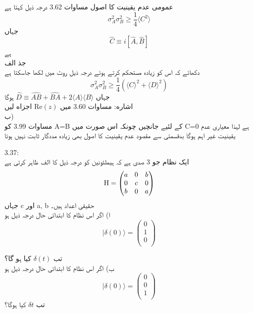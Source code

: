 عمومی عدم یقینيت کا اصول مساوات  3.62 درجہ ذيل کہتا ہے
\[\sigma_{A}^{2}\sigma_{B}^{2}\geq\frac{1}{4}\langle C^{2} \rangle\]
جہاں
\[\hat{C}\equiv i[\hat{A},\hat{B}]\]
ہے\\ 
جذ الف\\
دکھائے کہ اس کو زیادہ مستحكم کرتے ہوئے درجہ ذیل روٹ میں لکھا جاسکتا ہے
\[\sigma_{A}^{2}\sigma_{B}^{2}\geq\frac{1}{4}(\langle C\rangle^{2}+\langle D \rangle ^{2})\]
جہاں
\(\hat{D}\equiv \hat{AB}+\hat{BA}+2\langle A \rangle \langle B \rangle\)
ہوگا\\
اشاره: مساوات 3.60 میں 
\(\text{Re}(z)\)
 اجزاه لیں\\
ب)\\
مساوات 3.99 کو
 A=B
  کے لئیے جانچیں چونکہ اس صورت میں
 C=0
   ہے لہذا معیاری عدم یقینیت غیر اہم ہوگا بدقسمتی سے مقصود عدم یقینيت کا اصول بھی زیادہ مددگار ثابت نہیں ہوتا\\

 3.37:\\
ایک نظام جو 3 صدی ہے کہ ہیملٹونین کو درجہ ذيل کا الف ظاہر کرتی ہے
\[\text{\text{H}}=\begin{pmatrix}
a&0&b\\
0&c&0\\
b&0&a\\
\end{pmatrix}\]
جہاں c اور a, b حقیقی اعداد ہیں۔\\
ا) اگر اس نظام کا ابتدائی حال درجہ ذيل ہو
\[|\delta(0) \rangle=\begin{pmatrix}
0\\
1\\
0\\
\end{pmatrix}\]

تب
\(\delta(t)\)
  کیا ہو گا؟\\
ب) اگر اس نظام کا ابتدائی حال درجہ ذيل ہو
\[| \delta(0)\rangle =\begin{pmatrix}
0\\
0\\
1\\
\end{pmatrix}\]
تب
 \(\delta{t}\)
  کیا ہوگا؟\\

